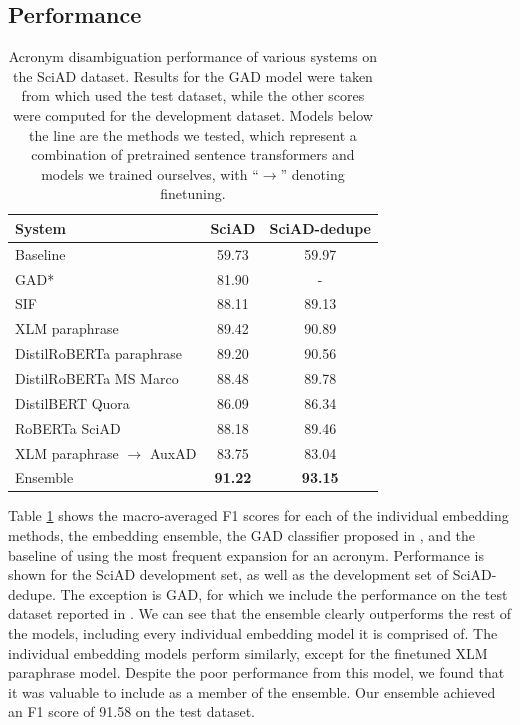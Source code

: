 \documentclass[letterpaper]{article} %
\begin{document}
\subsection{Performance}

\begin{table}[ht]
\centering
\begin{tabular}{@{}lcc@{}}
\toprule
\textbf{System} & \textbf{SciAD} & \textbf{SciAD-dedupe} \\ \midrule
Baseline & 59.73 & 59.97 \\
GAD* & 81.90 & - \\ \midrule
SIF & 88.11 & 89.13 \\
XLM paraphrase & 89.42 & 90.89 \\
DistilRoBERTa paraphrase & 89.20 & 90.56 \\
DistilRoBERTa MS Marco & 88.48 & 89.78 \\
DistilBERT Quora & 86.09 & 86.34 \\
RoBERTa SciAD & 88.18 & 89.46 \\
XLM paraphrase $\rightarrow$ AuxAD & 83.75 & 83.04 \\
Ensemble & \textbf{91.22} & \textbf{93.15} \\ \bottomrule
\end{tabular}
\caption{Acronym disambiguation performance of various systems on the SciAD dataset. Results for the GAD model were taken from \citeauthor{veyseh-et-al-2020-what} which used the test dataset, while the other scores were computed for the development dataset. Models below the line are the methods we tested, which represent a combination of pretrained sentence transformers and models we trained ourselves, with ``$\rightarrow$'' denoting finetuning.}
\label{tab:ad-results}
\end{table}

Table \ref{tab:ad-results} shows the macro-averaged F1 scores for each of the individual embedding methods, the embedding ensemble, the GAD classifier proposed in \citeauthor{veyseh-et-al-2020-what}, and the baseline of using the most frequent expansion for an acronym. Performance is shown for the SciAD development set, as well as the development set of SciAD-dedupe. The exception is GAD, for which we include the performance on the test dataset reported in \citeauthor{veyseh-et-al-2020-what}. We can see that the ensemble clearly outperforms the rest of the models, including every individual embedding model it is comprised of. The individual embedding models perform similarly, except for the finetuned XLM paraphrase model. Despite the poor performance from this model, we found that it was valuable to include as a member of the ensemble. Our ensemble achieved an F1 score of 91.58 on the test dataset.
\end{document}
